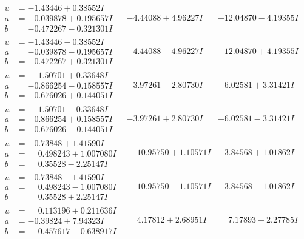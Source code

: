 \documentclass[1p]{elsarticle_modified}
\theoremstyle{definition}
\begin{document}
$$\begin{array}{c|c|c}
\begin{aligned}
u &= -1.43446 + 0.38552 I \\
a &= -0.039878 + 0.195657 I \\
b &= -0.472267 - 0.321301 I\end{aligned}
 & -4.44088 + 4.96227 I & -12.04870 - 4.19355 I \\ \hline\begin{aligned}
u &= -1.43446 - 0.38552 I \\
a &= -0.039878 - 0.195657 I \\
b &= -0.472267 + 0.321301 I\end{aligned}
 & -4.44088 - 4.96227 I & -12.04870 + 4.19355 I \\ \hline\begin{aligned}
u &= \phantom{-}1.50701 + 0.33648 I \\
a &= -0.866254 - 0.158557 I \\
b &= -0.676026 + 0.144051 I\end{aligned}
 & -3.97261 - 2.80730 I & -6.02581 + 3.31421 I \\ \hline\begin{aligned}
u &= \phantom{-}1.50701 - 0.33648 I \\
a &= -0.866254 + 0.158557 I \\
b &= -0.676026 - 0.144051 I\end{aligned}
 & -3.97261 + 2.80730 I & -6.02581 - 3.31421 I \\ \hline\begin{aligned}
u &= -0.73848 + 1.41590 I \\
a &= \phantom{-}0.498243 + 1.007080 I \\
b &= \phantom{-}0.35528 - 2.25147 I\end{aligned}
 & \phantom{-}10.95750 + 1.10571 I & -3.84568 + 1.01862 I \\ \hline\begin{aligned}
u &= -0.73848 - 1.41590 I \\
a &= \phantom{-}0.498243 - 1.007080 I \\
b &= \phantom{-}0.35528 + 2.25147 I\end{aligned}
 & \phantom{-}10.95750 - 1.10571 I & -3.84568 - 1.01862 I \\ \hline\begin{aligned}
u &= \phantom{-}0.113196 + 0.211636 I \\
a &= -0.39824 + 7.94323 I \\
b &= \phantom{-}0.457617 - 0.638917 I\end{aligned}
 & \phantom{-}4.17812 + 2.68951 I & \phantom{-}7.17893 - 2.27785 I \\ \hline\begin{aligned}

\end{aligned}
\end{array}$$
\end{document}
